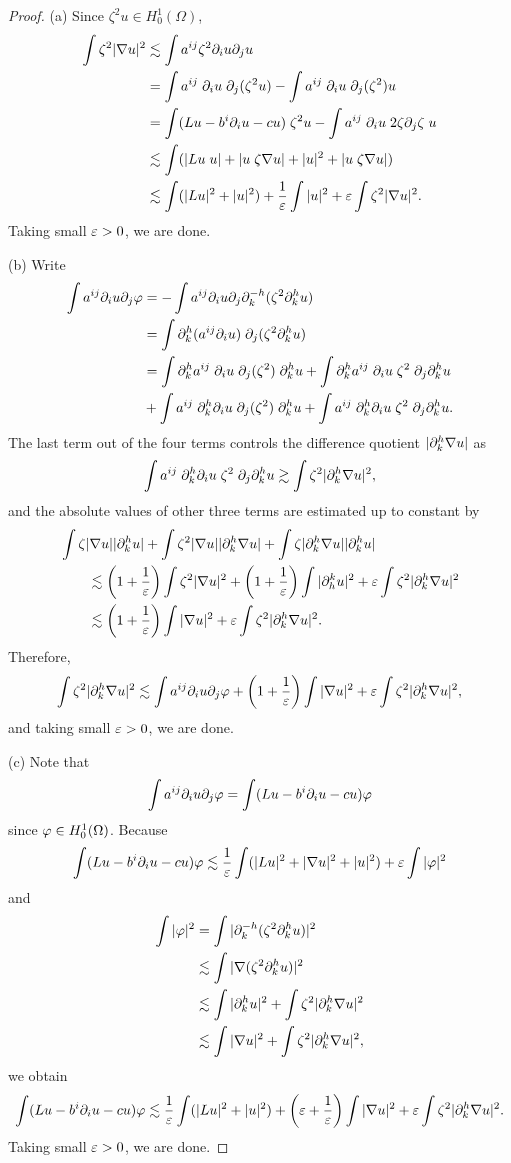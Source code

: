 \documentclass{../../large}
\begin{document}
\begin{proof}
(a)
Since $\zeta^2u\in H_0^1(\Omega)$,
\begin{align*}
\int\zeta^2|\nabla u|^2
&\lesssim\int a^{ij}\zeta^2\pd_iu\pd_ju\\
&=\int a^{ij}\;\pd_iu\;\pd_j(\zeta^2u)-\int a^{ij}\;\pd_iu\;\pd_j(\zeta^2)u\\
&=\int(Lu-b^i\pd_iu-cu)\;\zeta^2u-\int a^{ij}\;\pd_iu\;2\zeta\pd_j\zeta\;u\\
&\lesssim\int(|Lu\;u|+|u\;\zeta\nabla u|+|u|^2+|u\;\zeta\nabla u|)\\
&\lesssim\int(|Lu|^2+|u|^2)+\frac1\e\int|u|^2+\e\int\zeta^2|\nabla u|^2.
\end{align*}
Taking small $\varepsilon>0$, we are done.

(b)
Write
\begin{align*}
\int a^{ij}\pd_iu\pd_j\f
&=-\int a^{ij}\pd_iu\pd_j\pd_k^{-h}(\zeta^2\pd_k^hu)\\
&=\int\pd_k^h(a^{ij}\pd_iu)\;\pd_j(\zeta^2\pd_k^hu)\\
&=\int\pd_k^ha^{ij}\;\pd_iu\;\pd_j(\zeta^2)\;\pd_k^hu
+\int\pd_k^ha^{ij}\;\pd_iu\;\zeta^2\;\pd_j\pd_k^hu\\
&+\int a^{ij}\;\pd_k^h\pd_iu\;\pd_j(\zeta^2)\;\pd_k^hu
+\int a^{ij}\;\pd_k^h\pd_iu\;\zeta^2\;\pd_j\pd_k^hu.
\end{align*}
The last term out of the four terms controls the difference quotient $|\pd_k^h\nabla u|$ as
\[\int a^{ij}\;\pd_k^h\pd_iu\;\zeta^2\;\pd_j\pd_k^hu\gtrsim\int\zeta^2|\pd_k^h\nabla u|^2,\]
and the absolute values of other three terms are estimated up to constant by
\begin{align*}
&\int\zeta|\nabla u||\pd_k^h u|+\int\zeta^2|\nabla u||\pd_k^h\nabla u|+\int\zeta|\pd_k^h\nabla u||\pd_k^hu|\\
&\qquad\lesssim
\left(1+\frac1\e\right)\int\zeta^2|\nabla u|^2+\left(1+\frac1\e\right)\int|\pd_h^ku|^2+\e\int\zeta^2|\pd_k^h\nabla u|^2\\
&\qquad\lesssim
\left(1+\frac1\e\right)\int|\nabla u|^2+\e\int\zeta^2|\pd_k^h\nabla u|^2.
\end{align*}
Therefore,
\[\int\zeta^2|\pd_k^h\nabla u|^2\lesssim\int a^{ij}\pd_iu\pd_j\f+\left(1+\frac1\e\right)\int|\nabla u|^2+\e\int\zeta^2|\pd_k^h\nabla u|^2,\]
and taking small $\varepsilon>0$, we are done.

(c)
Note that
\[\int a^{ij}\pd_iu\pd_j\f=\int(Lu-b^i\pd_iu-cu)\f\]
since $\varphi\in H_0^1(\Omega)$.
Because
\[\int(Lu-b^i\pd_iu-cu)\f
\lesssim\frac1\e\int(|Lu|^2+|\nabla u|^2+|u|^2)+\e\int|\f|^2\]
and
\begin{align*}
\int|\f|^2&=\int|\pd_k^{-h}(\zeta^2\pd_k^hu)|^2\\
&\lesssim\int|\nabla(\zeta^2\pd_k^hu)|^2\\
&\lesssim\int|\pd_k^hu|^2+\int\zeta^2|\pd_k^h\nabla u|^2\\
&\lesssim\int|\nabla u|^2+\int\zeta^2|\pd_k^h\nabla u|^2,
\end{align*}
we obtain
\[\int(Lu-b^i\pd_iu-cu)\f
\lesssim\frac1\e\int(|Lu|^2+|u|^2)+\left(\e+\frac1\e\right)\int|\nabla u|^2+\e\int\zeta^2|\pd_k^h\nabla u|^2.\]
Taking small $\varepsilon>0$, we are done.
\end{proof}
\end{document}
